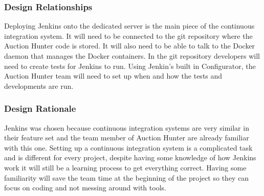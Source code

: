 \documentclass[onecolumn, draftclsnofoot, 10pt, compsoc]{IEEEtran}
\begin{document}
\subsubsection{Design Relationships}
Deploying Jenkins onto the dedicated server is the main piece of the continuous integration system. It will need to be connected to the git repository where the Auction Hunter code is stored. It will also need to be able to talk to the Docker daemon that manages the Docker containers. In the git repository developers will need to create tests for Jenkins to run. Using Jenkin's built in Configurator, the Auction Hunter team will need to set up when and how the tests and developments are run.

\subsubsection{Design Rationale}
Jenkins was chosen because continuous integration systems are very similar in their feature set and the team member of Auction Hunter are already familiar with this one. Setting up a continuous integration system is a complicated task and is different for every project, despite having some knowledge of how Jenkins work it will still be a learning process to get everything correct. Having some familiarity will save the team time at the beginning of the project so they can focus on coding and not messing around with tools. 


\newpage





\end{document}
